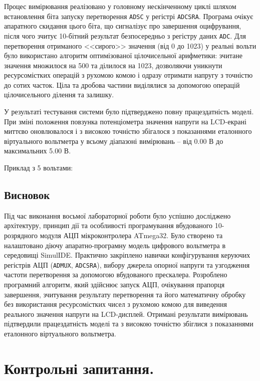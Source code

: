 \documentclass[14pt, a4paper]{extreport}
\begin{document}
	Процес вимірювання реалізовано у головному нескінченному циклі шляхом встановлення біта запуску перетворення \texttt{ADSC} у регістрі \texttt{ADCSRA}. Програма очікує апаратного скидання цього біта, що сигналізує про завершення оцифрування, після чого зчитує 10-бітний результат безпосередньо з регістру даних \texttt{ADC}. Для перетворення отриманого <<сирого>> значення (від 0 до 1023) у реальні вольти було використано алгоритм оптимізованої цілочисельної арифметики: зчитане значення множилося на 500 та ділилося на 1023, дозволяючи уникнути ресурсомістких операцій з рухомою комою і одразу отримати напругу з точністю до сотих часток. Ціла та дробова частини виділялися за допомогою операцій цілочисельного ділення та залишку. 
	
	У результаті тестування системи було підтверджено повну працездатність моделі. При зміні положення повзунка потенціометра значення напруги на LCD-екрані миттєво оновлювалося і з високою точністю збігалося з показаннями еталонного віртуального вольтметра у всьому діапазоні вимірювань -- від 0.00 В до максимальних 5.00 В.
	
	
	Приклад з 5 вольтами:
	
	
	\subsection*{Висновок}
	
	Під час виконання восьмої лабораторної роботи було успішно досліджено архітектуру, принцип дії та особливості програмування вбудованого 10-розрядного модуля АЦП мікроконтролера ATmega32. Було створено та налаштовано діючу апаратно-програмну модель цифрового вольтметра в середовищі SimulIDE. Практично закріплено навички конфігурування керуючих регістрів АЦП (\texttt{ADMUX}, \texttt{ADCSRA}), вибору джерела опорної напруги та узгодження частоти перетворення за допомогою вбудованого прескалера. Розроблено програмний алгоритм, який здійснює запуск АЦП, очікування прапорця завершення, зчитування результату перетворення та його математичну обробку без використання ресурсомістких чисел з рухомою комою для виведення реального значення напруги на LCD-дисплей. Отримані результати вимірювань підтвердили працездатність моделі та з високою точністю збіглися з показаннями еталонного віртуального вольтметра.
	
	\section*{Контрольні запитання.}
	
\end{document}
